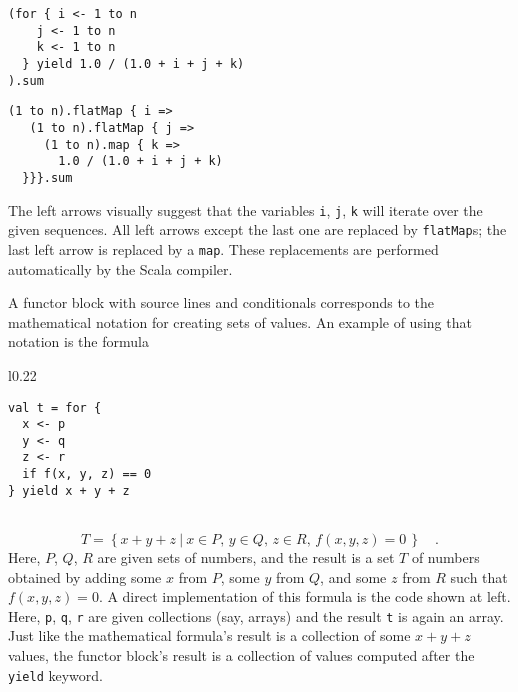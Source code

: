 \noindent \texttt{\textcolor{blue}{\footnotesize{}}}%
\begin{minipage}[c]{0.475\columnwidth}%
\texttt{\textcolor{blue}{\footnotesize{}}}
\begin{lstlisting}
(for { i <- 1 to n
    j <- 1 to n
    k <- 1 to n
  } yield 1.0 / (1.0 + i + j + k)
).sum
\end{lstlisting}
%
\end{minipage}\texttt{\textcolor{blue}{\footnotesize{}\hspace*{\fill}}}%
\begin{minipage}[c]{0.475\columnwidth}%
\texttt{\textcolor{blue}{\footnotesize{}}}
\begin{lstlisting}
(1 to n).flatMap { i =>
   (1 to n).flatMap { j =>
     (1 to n).map { k =>
       1.0 / (1.0 + i + j + k)
  }}}.sum
\end{lstlisting}
%
\end{minipage}{\footnotesize\par}

\vspace{0.2\baselineskip}
The left arrows visually suggest that the variables \lstinline!i!,
\lstinline!j!, \lstinline!k! will iterate over the given sequences.
All left arrows except the last one are replaced by \lstinline!flatMap!s;
the last left arrow is replaced by a \lstinline!map!. These replacements
are performed automatically by the Scala compiler.

A functor block with source lines and conditionals corresponds to
the mathematical notation for creating sets of values. An example
of using that notation is the formula

\begin{wrapfigure}{l}{0.22\columnwidth}%
\vspace{-0.6\baselineskip}
\begin{lstlisting}
val t = for {
  x <- p
  y <- q
  z <- r
  if f(x, y, z) == 0
} yield x + y + z
\end{lstlisting}
\vspace{0.6\baselineskip}
\end{wrapfigure}%

~\vspace{-0.3\baselineskip}
\[
T=\left\{ \left.x+y+z~\right|~x\in P,\,y\in Q,\,z\in R,\,f(x,y,z)=0\,\right\} \quad.
\]
Here, $P$, $Q$, $R$ are given sets of numbers, and the result is
a set $T$ of numbers obtained by adding some $x$ from $P$, some
$y$ from $Q$, and some $z$ from $R$ such that $f(x,y,z)=0$. A
direct implementation of this formula is the code shown at left. Here,
\lstinline!p!, \lstinline!q!, \lstinline!r! are given collections
(say, arrays) and the result \lstinline!t! is again an array. Just
like the mathematical formula\textsf{'}s result is a collection of some $x+y+z$
values, the functor block\textsf{'}s result is a collection of values computed
after the \lstinline!yield! keyword.

